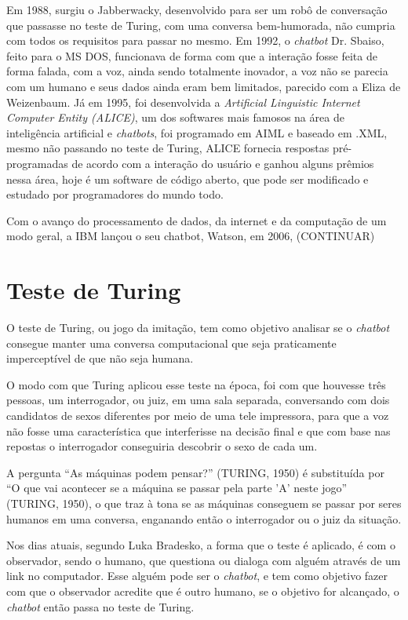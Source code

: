 \documentclass[
	12pt,				%
	oneside,
	a4paper,			%
	english,			%
	french,				%
	spanish,			%
	brazil				%
	]{abntex2}
\begin{document}
Em 1988, surgiu o Jabberwacky, desenvolvido para ser um robô de conversação que passasse no teste de Turing, com uma conversa bem-humorada, não cumpria com todos os requisitos para passar no mesmo. 
Em 1992, o \emph{chatbot} Dr. Sbaiso, feito para o MS DOS, funcionava de forma com que a interação fosse feita de forma falada, com a voz, ainda sendo totalmente inovador, a voz não se parecia com um humano e seus dados ainda eram bem limitados, parecido com a Eliza de Weizenbaum.
Já em 1995, foi desenvolvida a \emph{Artificial Linguistic Internet Computer Entity (ALICE)}, um dos softwares mais famosos na área de inteligência artificial e \emph{chatbots}, foi programado em AIML e baseado em .XML, mesmo não passando no teste de Turing, ALICE fornecia respostas pré-programadas de acordo com a interação do usuário e ganhou alguns prêmios nessa área, hoje é um software de código aberto, que pode ser modificado e estudado por programadores do mundo todo.

Com o avanço do processamento de dados, da internet e da computação de um modo geral, a IBM lançou o seu chatbot, Watson, em 2006,
(CONTINUAR)


\section{Teste de Turing}
O teste de Turing, ou jogo da imitação, tem como objetivo analisar se o \emph{chatbot} consegue manter uma conversa computacional que seja praticamente imperceptível de que não seja humana.

O modo com que Turing aplicou esse teste na época, foi com que houvesse três pessoas, um interrogador, ou juiz, em uma sala separada, conversando com dois candidatos de sexos diferentes por meio de uma tele impressora, para que a voz não fosse uma característica que interferisse na decisão final e que com base nas repostas o interrogador conseguiria descobrir o sexo de cada um.

A pergunta “As máquinas podem pensar?” (TURING, 1950) é substituída por “O que vai acontecer se a máquina se passar pela parte 'A' neste jogo” (TURING, 1950), o que traz à tona se as máquinas conseguem se passar por seres humanos em uma conversa, enganando então o interrogador ou o juiz da situação.

Nos dias atuais, segundo Luka Bradesko, a forma que o teste é aplicado, é com o observador, sendo o humano, que questiona ou dialoga com alguém através de um link no computador. Esse alguém pode ser o \emph{chatbot}, e tem como objetivo fazer com que o observador acredite que é outro humano, se o objetivo for alcançado, o \emph{chatbot} então passa no teste de Turing.
\end{document}
